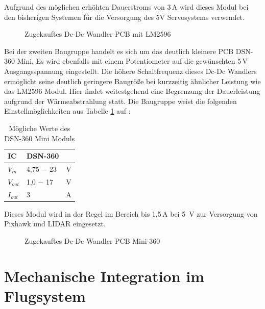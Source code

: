 Aufgrund des möglichen erhöhten Dauerstroms von 3\,A wird dieses Modul bei den bisherigen Systemen für die Versorgung des 5V Servosystems verwendet.

\begin{figure}[H]
\centering
{}
\caption{Zugekauftes Dc-Dc Wandler PCB mit LM2596} 
\label{fig:Zugekauftes Dc-Dc Wandler PCB mit LM2596}
\end{figure}

Bei der zweiten Baugruppe handelt es sich um das deutlich kleinere PCB DSN-360 Mini.
Es wird ebenfalls mit einem Potentiometer auf die gewünschten 5\,V Ausgangsspannung eingestellt. Die höhere Schaltfrequenz dieses Dc-Dc Wandlers ermöglicht seine deutlich geringere Baugröße bei kurzzeitig ähnlicher Leistung wie das LM2596 Modul. Hier findet weitestgehend eine Begrenzung der Dauerleistung aufgrund der Wärmeabstrahlung statt.
Die Baugruppe weist die folgenden Einstellmöglichkeiten aus Tabelle \ref{Mögliche Werte des DSN-360 Mini Moduls} auf :

\begin{table}[h]
\centering
\begin{tabular}{|l|l|l|}
\hline
IC    & DSN-360    &   \\ \hline
$V_{in}$  & 4,75 $-$ 23 & V \\ \hline
$V_{out}$ & 1,0 $-$ 17  & V \\ \hline
$I_{out}$ & 3         & A \\ \hline
\end{tabular}
\caption{Mögliche Werte des DSN-360 Mini Moduls}
\label{Mögliche Werte des DSN-360 Mini Moduls}
\end{table}

Dieses Modul wird in der Regel im Bereich bis 1,5\,A bei 5 \,V zur Versorgung von Pixhawk und LIDAR eingesetzt.

\begin{figure}[H]
\centering
{}
\caption{Zugekauftes Dc-Dc Wandler PCB Mini-360} 
\label{fig:Zugekauftes Dc-Dc Wandler PCB Mini-360}
\end{figure}

\section{Mechanische Integration im Flugsystem}

